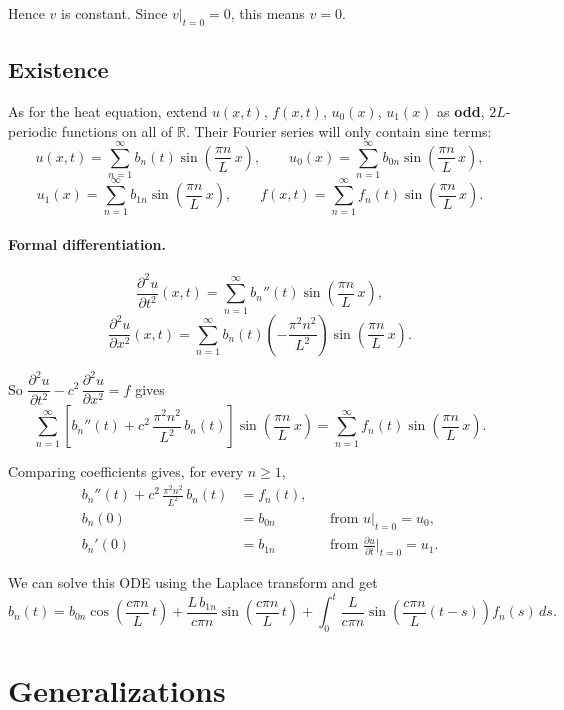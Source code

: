 Hence $v$ is constant. Since $v|_{t=0} = 0$, this means $v = 0$.

\subsection{Existence}

As for the heat equation, extend $u(x, t)$, $f(x, t)$, $u_0(x)$, $u_1(x)$ as \textbf{odd}, $2L$-periodic functions on all of $\mathbb{R}$. Their Fourier series will only contain sine terms:
\[
u(x, t) = \sum_{n=1}^{\infty} b_n(t)\sin\!\left(\frac{\pi n}{L}\,x\right), \qquad
u_0(x) = \sum_{n=1}^{\infty} b_{0n}\sin\!\left(\frac{\pi n}{L}\,x\right),
\]
\[
u_1(x) = \sum_{n=1}^{\infty} b_{1n}\sin\!\left(\frac{\pi n}{L}\,x\right), \qquad
f(x, t) = \sum_{n=1}^{\infty} f_n(t)\sin\!\left(\frac{\pi n}{L}\,x\right).
\]

\paragraph{Formal differentiation.}
\[
\frac{\partial^2 u}{\partial t^2}(x, t) = \sum_{n=1}^{\infty} b_n''(t)\sin\!\left(\frac{\pi n}{L}\,x\right),
\]
\[
\frac{\partial^2 u}{\partial x^2}(x, t) = \sum_{n=1}^{\infty} b_n(t)\left(-\frac{\pi^2 n^2}{L^2}\right)\sin\!\left(\frac{\pi n}{L}\,x\right).
\]

So $\dfrac{\partial^2 u}{\partial t^2} - c^2\,\dfrac{\partial^2 u}{\partial x^2} = f$ gives
\[
\sum_{n=1}^{\infty}\left[b_n''(t) + c^2\,\frac{\pi^2 n^2}{L^2}\,b_n(t)\right]\sin\!\left(\frac{\pi n}{L}\,x\right) = \sum_{n=1}^{\infty} f_n(t)\sin\!\left(\frac{\pi n}{L}\,x\right).
\]

Comparing coefficients gives, for every $n \geq 1$,
\[
\boxed{
\begin{aligned}
b_n''(t) + c^2\,\frac{\pi^2 n^2}{L^2}\,b_n(t) &= f_n(t), \\
b_n(0) &= b_{0n} && \text{from } u|_{t=0} = u_0, \\
b_n'(0) &= b_{1n} && \text{from } \tfrac{\partial u}{\partial t}\big|_{t=0} = u_1.
\end{aligned}}
\]

We can solve this ODE using the Laplace transform and get
\[
\boxed{b_n(t) = b_{0n}\cos\!\left(\frac{c\pi n}{L}\,t\right) + \frac{L\,b_{1n}}{c\pi n}\sin\!\left(\frac{c\pi n}{L}\,t\right) + \int_0^t \frac{L}{c\pi n}\sin\!\left(\frac{c\pi n}{L}(t - s)\right) f_n(s)\,ds.}
\]

\section{Generalizations}

